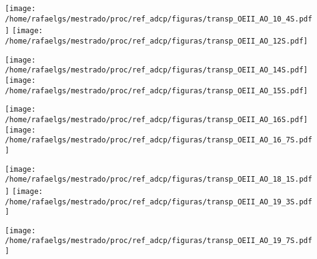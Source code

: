 \documentclass[12pt,portuguese,a4paper,pdftex]{report}
\begin{document}
  \texttt{[image: /home/rafaelgs/mestrado/proc/ref\_adcp/figuras/transp\_OEII\_AO\_10\_4S.pdf]}
  \texttt{[image: /home/rafaelgs/mestrado/proc/ref\_adcp/figuras/transp\_OEII\_AO\_12S.pdf]}

  \texttt{[image: /home/rafaelgs/mestrado/proc/ref\_adcp/figuras/transp\_OEII\_AO\_14S.pdf]}
  \texttt{[image: /home/rafaelgs/mestrado/proc/ref\_adcp/figuras/transp\_OEII\_AO\_15S.pdf]}
  
  \texttt{[image: /home/rafaelgs/mestrado/proc/ref\_adcp/figuras/transp\_OEII\_AO\_16S.pdf]}
  \texttt{[image: /home/rafaelgs/mestrado/proc/ref\_adcp/figuras/transp\_OEII\_AO\_16\_7S.pdf]}

  \texttt{[image: /home/rafaelgs/mestrado/proc/ref\_adcp/figuras/transp\_OEII\_AO\_18\_1S.pdf]}
  \texttt{[image: /home/rafaelgs/mestrado/proc/ref\_adcp/figuras/transp\_OEII\_AO\_19\_3S.pdf]}
  
  \texttt{[image: /home/rafaelgs/mestrado/proc/ref\_adcp/figuras/transp\_OEII\_AO\_19\_7S.pdf]}







  
\end{document}
